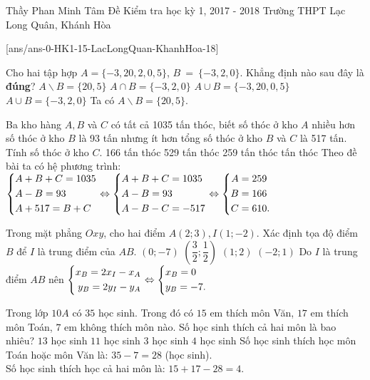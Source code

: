 
	\begin{name}
		{Thầy Phan Minh Tâm}
		{Đề Kiểm tra học kỳ 1, 2017 - 2018 Trường THPT Lạc Long Quân, Khánh Hòa }
	\end{name}
	\setcounter{ex}{0}
	[ans/ans-0-HK1-15-LacLongQuan-KhanhHoa-18]
\begin{ex}%
Cho hai tập hợp $ A = \{-3,20,2,0,5\}$, $B~=~\{-3,2,0\} $. Khẳng định nào sau đây là \textbf{đúng}?
\choice
{\True $ A \backslash B = \{20,5\} $}
{$ A \cap B = \{-3,2,0\} $}
{$ A \cup B = \{-3,20,0,5\} $}
{$ A \cup B = \{-3,2,0\} $}
\loigiai
{
Ta có $ A \backslash B = \{20,5\}. $
}
\end{ex}

\begin{ex}%
Ba kho hàng  $A,B$  và  $C$ có tất cả 1035 tấn thóc, biết số thóc ở kho  $A$  nhiều hơn số thóc ở kho  $B$  là 93 tấn nhưng ít hơn tổng số thóc ở kho  $B$  và  $C$  là 517 tấn. Tính số thóc ở kho  $C$.	
\choice
{166 tấn thóc}
{529 tấn thóc}
{259 tấn thóc}
{ tấn thóc}
	\loigiai
	{
	Theo đề bài ta có hệ phương trình:\\
$\left\{\begin{aligned}&A+B+C=1035\\&A-B=93\\&A+517=B+C\end{aligned}\right. \Leftrightarrow 	\left\{\begin{aligned}&A+B+ C=1035\\&A-B=93\\&A-B-C=-517\end{aligned}\right. \Leftrightarrow \left\{\begin{aligned}A&=259\\B&=166\\C&=610.\end{aligned}\right.$
	}
\end{ex}
\begin{ex}%
	Trong mặt phẳng  $Oxy$, cho hai điểm  $A(2;3),I(1;-2)$.  Xác định tọa độ điểm  $B$  để  $I$ là trung điểm của  $AB$.
	\choice
	{\True $ (0;-7) $}
	{$  \left(\dfrac{3}{2};\dfrac{1}{2} \right)$}
	{$ (1;2) $}
	{$ (-2;1) $}
	\loigiai
	{
Do $ I $ là trung điểm $ AB $ nên $ \left\{\begin{aligned}x_B = 2x_I - x_A\\y_B = 2y_I-y_A\end{aligned}\right. \Leftrightarrow \left\{\begin{aligned}&x_B = 0\\&y_B=-7.\end{aligned}\right. $
	}
\end{ex}
\begin{ex}%
	Trong lớp $10A$ có $35$ học sinh. Trong đó có $15$ em thích môn Văn, $17$ em thích môn Toán, $7$ em không thích môn nào. Số học sinh thích cả hai môn là bao nhiêu?
\choice
	{$13$ học sinh}
	{$11$ học sinh}
	{$3$ học sinh}
	{\True $4$ học sinh}
\loigiai
	{
Số học sinh thích học môn Toán hoặc môn Văn là: $ 35 - 7 = 28 $ (học sinh).\\
Số học sinh thích học cả hai môn là: $ 15 + 17 - 28 = 4 $.
	}
\end{ex}
